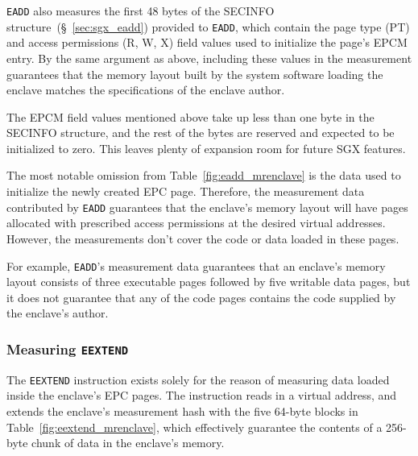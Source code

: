 \texttt{EADD} also measures the first 48 bytes of the SECINFO
structure~(\S~\ref{sec:sgx_eadd}) provided to \texttt{EADD}, which contain the
page type (PT) and access permissions (R, W, X) field values used to initialize
the page's EPCM entry. By the same argument as above, including these values in
the measurement guarantees that the memory layout built by the system software
loading the enclave matches the specifications of the enclave author.

The EPCM field values mentioned above take up less than one byte in the SECINFO
structure, and the rest of the bytes are reserved and expected to be
initialized to zero. This leaves plenty of expansion room for future SGX
features.

The most notable omission from Table~\ref{fig:eadd_mrenclave} is the data used
to initialize the newly created EPC page. Therefore, the measurement data
contributed by \texttt{EADD} guarantees that the enclave's memory layout
will have pages allocated with prescribed access permissions at the desired
virtual addresses. However, the measurements don't cover the code or data
loaded in these pages.

For example, \texttt{EADD}'s measurement data guarantees that an enclave's
memory layout consists of three executable pages followed by five writable data
pages, but it does not guarantee that any of the code pages contains the
code supplied by the enclave's author.


\subsubsection{Measuring \texttt{EEXTEND}}
\label{sec:sgx_eextend}


The \texttt{EEXTEND} instruction exists solely for the reason of measuring data
loaded inside the enclave's EPC pages. The instruction reads in a virtual
address, and extends the enclave's measurement hash with the five 64-byte
blocks in Table~\ref{fig:eextend_mrenclave}, which effectively guarantee the
contents of a 256-byte chunk of data in the enclave's memory.

